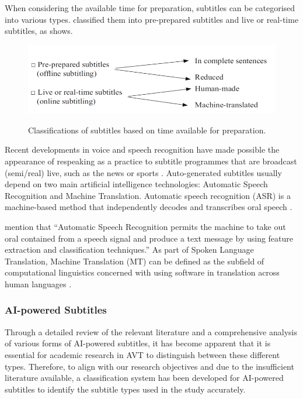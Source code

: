 \documentclass[english]{textolivre}
\begin{document}
When considering the available time for preparation, subtitles can be
categorised into various types. \textcite{diaz-cintas__2007} classified them into pre-prepared subtitles and live or
real-time subtitles, as  shows.

\begin{figure}[htbp]
\centering
\begin{minipage}{.7\textwidth}
\includegraphics[width=\textwidth]{Picture2.png}
\caption{Classifications of subtitles based on time available for preparation.}
\label{fig:fig2}
\end{minipage}
\end{figure}

Recent developments in voice and speech recognition have made possible
the appearance of respeaking as a practice to subtitle programmes that
are broadcast (semi/real) live, such as the news or sports \cite{remael_audiovisual_2010}. 
Auto-generated subtitles usually depend on two main artificial
intelligence technologies: Automatic Speech Recognition and Machine
Translation. Automatic speech recognition (ASR) is a machine-based
method that independently decodes and transcribes oral speech
\cite{suvorov_automatic_2012}.

\textcite{dharmale_evaluation_2019} mention that
``Automatic Speech Recognition permits the machine to take out oral
contained from a speech signal and produce a text message by using
feature extraction and classification techniques.'' As part of Spoken
Language Translation, Machine Translation (MT) can be defined as the
subfield of computational linguistics concerned with using software in
translation across human languages \cite{almahasees_machine_2017}.
	
\subsubsection{AI-powered Subtitles}\label{subsubsec-AI-powered-Subtitles}

Through a detailed review of the relevant literature and a comprehensive
analysis of various forms of AI-powered subtitles, it has become
apparent that it is essential for academic research in AVT to
distinguish between these different types. Therefore, to align with our
research objectives and due to the insufficient literature available, a
classification system has been developed for AI-powered subtitles to
identify the subtitle types used in the study accurately.
\end{document}
